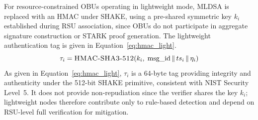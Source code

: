 \documentclass[12pt, a4paper]{report}
\begin{document}
For resource-constrained \ac{OBU}s operating in
lightweight mode, \ac{MLDSA} is replaced with an
\ac{HMAC} under \ac{SHAKE}, using a pre-shared
symmetric key $k_i$ established during \ac{RSU}
association, since \ac{OBU}s do not participate in
aggregate signature construction or \ac{STARK} proof
generation. The lightweight authentication tag is
given in Equation~\eqref{eq:hmac_light}.
\begin{equation}
\tau_i = \textsc{HMAC-SHA3-512}\!\left(k_i,\;
\text{msg\_id} \,\|\, ts_i \,\|\, \eta_i
\right)
\label{eq:hmac_light}
\end{equation}
As given in Equation~\eqref{eq:hmac_light}, $\tau_i$
is a 64-byte tag providing integrity and authenticity
under the 512-bit \ac{SHAKE} primitive, consistent
with NIST Security Level~5. It does not provide
non-repudiation since the verifier shares the key
$k_i$; lightweight nodes therefore contribute only
to rule-based detection and depend on \ac{RSU}-level
full verification for mitigation.
\end{document}

